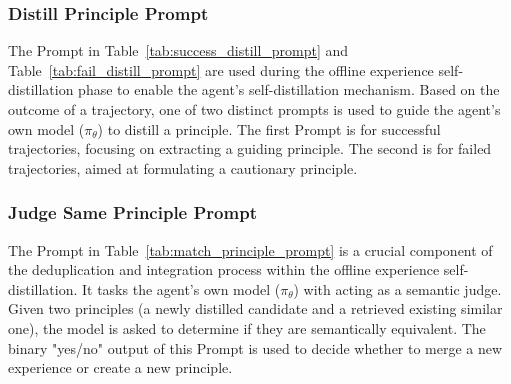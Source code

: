 \subsubsection{Distill Principle Prompt}
The Prompt in Table~\ref{tab:success_distill_prompt} and Table~\ref{tab:fail_distill_prompt} are used during the offline experience self-distillation phase to enable the agent's self-distillation mechanism. Based on the outcome of a trajectory, one of two distinct prompts is used to guide the agent's own model ($\pi_\theta$) to distill a principle. The first Prompt is for successful trajectories, focusing on extracting a guiding principle. The second is for failed trajectories, aimed at formulating a cautionary principle.


\subsubsection{Judge Same Principle Prompt}
The Prompt in Table~\ref{tab:match_principle_prompt} is a crucial component of the deduplication and integration process within the offline experience self-distillation. It tasks the agent's own model ($\pi_\theta$) with acting as a semantic judge. Given two principles (a newly distilled candidate and a retrieved existing similar one), the model is asked to determine if they are semantically equivalent. The binary "yes/no" output of this Prompt is used to decide whether to merge a new experience or create a new principle.



